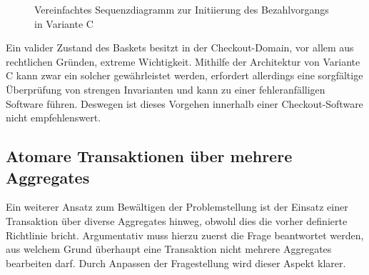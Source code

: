 \begin{figure}[htbp]
	\centering
	
	\caption{Vereinfachtes Sequenzdiagramm zur Initiierung des Bezahlvorgangs in Variante C}
	\label{fig:VarC-Sequence-Alt}
\end{figure}

Ein valider Zustand des Baskets besitzt in der Checkout-Domain, vor allem aus rechtlichen Gründen, extreme Wichtigkeit. Mithilfe der Architektur von Variante C kann zwar ein solcher gewährleistet werden, erfordert allerdings eine sorgfältige Überprüfung von strengen Invarianten und kann zu einer fehleranfälligen Software führen. Deswegen ist dieses Vorgehen innerhalb einer Checkout-Software nicht empfehlenswert. 


\subsection{Atomare Transaktionen über mehrere Aggregates}

Ein weiterer Ansatz zum Bewältigen der Problemstellung ist der Einsatz einer Transaktion über diverse Aggregates hinweg, obwohl dies die vorher definierte Richtlinie bricht. Argumentativ muss hierzu zuerst die Frage beantwortet werden, aus welchem Grund überhaupt eine Transaktion nicht mehrere Aggregates bearbeiten darf. Durch Anpassen der Fragestellung wird dieser Aspekt klarer. 

